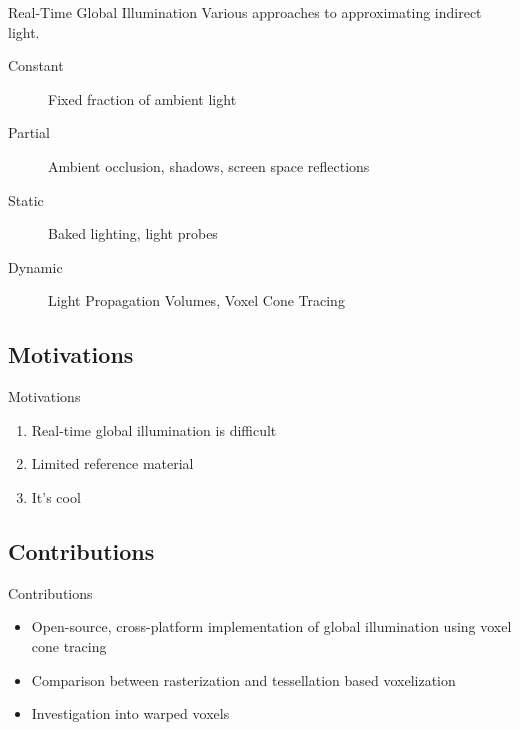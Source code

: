 \documentclass[10pt]{beamer}
\begin{document}
\begin{frame}{Real-Time Global Illumination}
  Various approaches to approximating indirect light.

  \begin{description}
    \item[Constant] Fixed fraction of ambient light %
    \item[Partial] Ambient occlusion, shadows, screen space reflections %
    \item[Static] Baked lighting, light probes
    \item[Dynamic] Light Propagation Volumes, Voxel Cone Tracing
  \end{description}
\end{frame}



\subsection{Motivations}
\begin{frame}{Motivations}
  \begin{enumerate}
    \centering
    \item Real-time global illumination is difficult %
    \item Limited reference material %
    \pause
    \item It's cool %
  \end{enumerate}
\end{frame}

\subsection{Contributions}
\begin{frame}{Contributions}
  \begin{itemize}
    \item Open-source, cross-platform implementation of global illumination using voxel cone tracing
    \item Comparison between rasterization and tessellation based voxelization
    \item Investigation into warped voxels %
  \end{itemize}
\end{frame}
\end{document}
